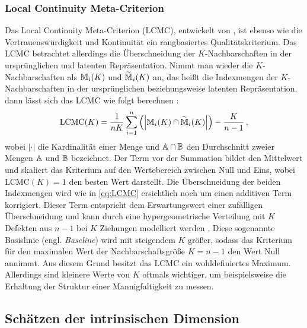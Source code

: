 \subsubsection{Local Continuity Meta-Criterion}
\label{ch:Vergleich:sec:Methodik:subsec:Qualitaetskriterien:LCMC}
Das Local Continuity Meta-Criterion (LCMC), entwickelt von \textcite{Chen.2009}, ist ebenso wie die Vertrauenswürdigkeit und Kontinuität ein rangbasiertes Qualitätskriterium. Das LCMC betrachtet allerdings die Überschneidung der $K$-Nachbarschaften in der ursprünglichen und latenten Repräsentation. Nimmt man wieder die $K$-Nachbarschaften als $\mathbb{M}_i(K)$ und $\widetilde{\mathbb{M}}_i(K)$ an, das heißt die Indexmengen der $K$-Nachbarschaften in der ursprünglichen beziehungsweise latenten Repräsentation, dann lässt sich das LCMC wie folgt berechnen \parencite[212]{Chen.2009}:
\begin{equation}
	\label{eq:LCMC}
	\text{LCMC}(K) = \frac{1}{nK} \sum_{i=1}^{n} \left( \left| \mathbb{M}_i(K) \cap \widetilde{\mathbb{M}}_i(K) \right| \right) - \frac{K}{n - 1} \,,
\end{equation}
wobei $­|\cdot|$ die Kardinalität einer Menge und $\mathbb{A} \cap \mathbb{B}$ den Durchschnitt zweier Mengen $\mathbb{A}$ und $\mathbb{B}$ bezeichnet. Der Term vor der Summation bildet den Mittelwert und skaliert das Kriterium auf den Wertebereich zwischen Null und Eins, wobei LCMC$(K) = 1$ den besten Wert darstellt. Die Überschneidung der beiden Indexmengen wird wie in \eqref{eq:LCMC} ersichtlich noch um einen additiven Term korrigiert. Dieser Term entspricht dem Erwartungswert einer zufälligen Überschneidung und kann durch eine hypergeometrische Verteilung mit $K$ Defekten aus $n - 1$ bei $K$ Ziehungen modelliert werden \parencite[213]{Chen.2009}. Diese sogenannte Basislinie (engl. \textit{Baseline}) wird mit steigendem
$K$ größer, sodass das Kriterium für den maximalen Wert der Nachbarschaftsgröße $K = n - 1$ den
Wert Null annimmt. Aus diesem Grund besitzt das LCMC ein wohldefiniertes Maximum. Allerdings sind
kleinere Werte von $K$ oftmals wichtiger, um beispielsweise die Erhaltung der Struktur einer
Mannigfaltigkeit zu messen.

\subsection{Schätzen der intrinsischen Dimension}
\label{ch:Vergleich:sec:Methodik:subsec:SchaetzenDerIntrinsischenDim}

